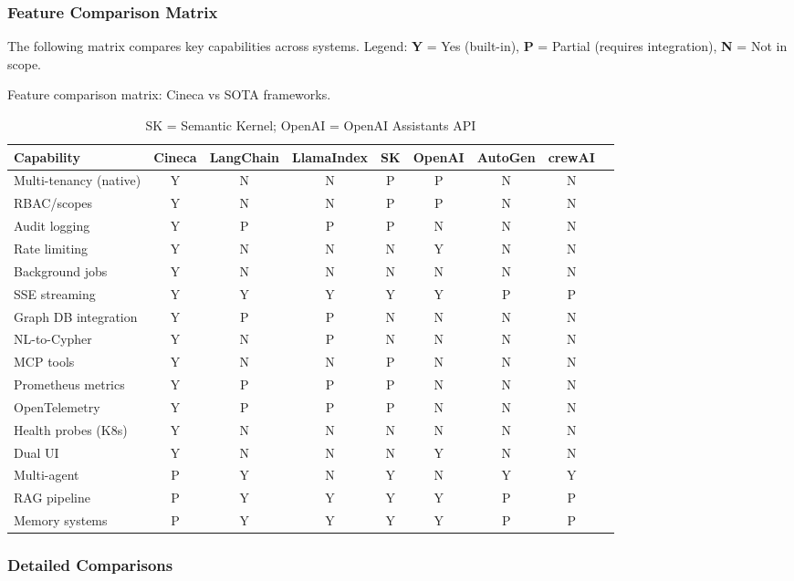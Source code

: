 \subsubsection{Feature Comparison Matrix}

The following matrix compares key capabilities across systems. Legend: \textbf{Y} = Yes (built-in), \textbf{P} = Partial (requires integration), \textbf{N} = Not in scope.

\begin{table}[ht]
\centering
\caption{Feature comparison matrix: Cineca vs SOTA frameworks.}
\label{tab:feature-comparison}
\small
\setlength{\tabcolsep}{3pt}
\begin{tabular}{lcccccccc}
\hline
\textbf{Capability} & \textbf{Cineca} & \textbf{LangChain} & \textbf{LlamaIndex} & \textbf{SK} & \textbf{OpenAI} & \textbf{AutoGen} & \textbf{crewAI} \\
\hline
Multi-tenancy (native) & Y & N & N & P & P & N & N \\
RBAC/scopes & Y & N & N & P & P & N & N \\
Audit logging & Y & P & P & P & N & N & N \\
Rate limiting & Y & N & N & N & Y & N & N \\
Background jobs & Y & N & N & N & N & N & N \\
SSE streaming & Y & Y & Y & Y & Y & P & P \\
Graph DB integration & Y & P & P & N & N & N & N \\
NL-to-Cypher & Y & N & P & N & N & N & N \\
MCP tools & Y & N & N & P & N & N & N \\
Prometheus metrics & Y & P & P & P & N & N & N \\
OpenTelemetry & Y & P & P & P & N & N & N \\
Health probes (K8s) & Y & N & N & N & N & N & N \\
Dual UI & Y & N & N & N & Y & N & N \\
Multi-agent & P & Y & N & Y & N & Y & Y \\
RAG pipeline & P & Y & Y & Y & Y & P & P \\
Memory systems & P & Y & Y & Y & Y & P & P \\
\hline
\end{tabular}
\caption*{SK = Semantic Kernel; OpenAI = OpenAI Assistants API}
\end{table}

\subsubsection{Detailed Comparisons}


